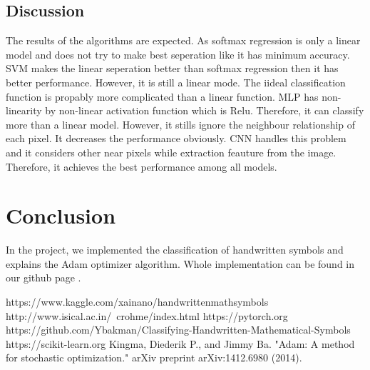 \documentclass[10pt]{article}
\begin{document}
\subsection{Discussion}
The results of the algorithms are expected. As softmax regression is only a linear model and does not try to make best seperation like it has minimum accuracy. SVM makes the linear seperation better than softmax regression then it has better performance. However, it is still a linear mode. The iideal classification function is propably more complicated than a linear function. MLP has non-linearity by non-linear activation function which is Relu. Therefore, it can classify more than a linear model. However, it stills ignore the neighbour relationship of each pixel. It decreases the performance obviously. CNN handles this problem and it considers other near pixels while extraction feauture from the image. Therefore, it achieves the best performance among all models.
\section{Conclusion}
In the project, we implemented the classification of handwritten symbols and explains the Adam optimizer algorithm. Whole implementation can be found in our github page \cite{github}.





\begin{thebibliography}{2}
 https://www.kaggle.com/xainano/handwrittenmathsymbols
 http://www.isical.ac.in/~crohme/index.html
 https://pytorch.org
 https://github.com/Ybakman/Classifying-Handwritten-Mathematical-Symbols
 https://scikit-learn.org
Kingma, Diederik P., and Jimmy Ba. "Adam: A method for stochastic optimization." arXiv preprint arXiv:1412.6980 (2014).
\end{thebibliography}
\end{document}
